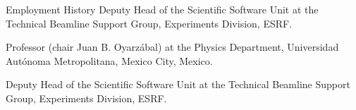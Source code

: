 \begin{rubric}{Employment History}
\entry*[2009 –- 2006]  Deputy Head of the Scientific Software Unit at the Technical Beamline Support Group, Experiments Division, ESRF.


\entry*[2005] Professor (chair Juan B. Oyarz\'abal) at the Physics Department, Universidad Aut\'onoma Metropolitana, Mexico City, Mexico.


\entry*[2000 –- 2004]  Deputy Head of the Scientific Software Unit at the Technical Beamline Support Group, Experiments Division, ESRF.



\end{rubric}
